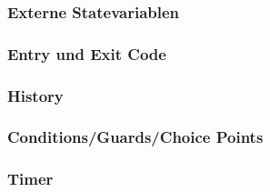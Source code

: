 \documentclass{beamer}
\begin{document}
\begin{frame}
 \frametitle{Externe Statevariablen}
\end{frame}

\begin{frame}
 \frametitle{Entry und Exit Code}
\end{frame}

\begin{frame}
 \frametitle{History}
\end{frame}

\begin{frame}
 \frametitle{Conditions/Guards/Choice Points}
\end{frame}

\begin{frame}
 \frametitle{Timer}
\end{frame}
\end{document}
